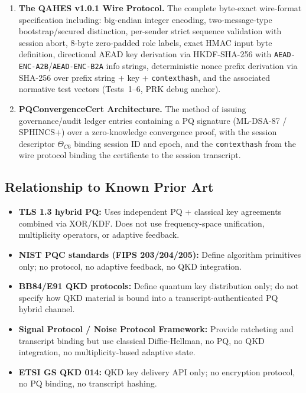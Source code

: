 \documentclass[12pt,letterpaper]{article}
\theoremstyle{plain}
\theoremstyle{definition}
\begin{document}
\begin{defensebox}
\begin{enumerate}[leftmargin=2em]
  \item \textbf{The QAHES v1.0.1 Wire Protocol.}
    The complete byte-exact wire-format specification including:
    big-endian integer encoding, two-message-type bootstrap/secured
    distinction, per-sender strict sequence validation with session abort,
    8-byte zero-padded role labels, exact HMAC input byte definition,
    directional AEAD key derivation via HKDF-SHA-256 with
    \texttt{AEAD-ENC-A2B}/\texttt{AEAD-ENC-B2A} info strings, deterministic
    nonce prefix derivation via SHA-256 over prefix string + key +
    \texttt{contexthash}, and the associated normative test vectors
    (Tests~1--6, PRK debug anchor).

  \item \textbf{PQConvergenceCert Architecture.}
    The method of issuing governance/audit ledger entries containing a
    PQ signature (ML-DSA-87 / SPHINCS+) over a zero-knowledge convergence
    proof, with the session descriptor $\Theta_{C6}$ binding session ID and
    epoch, and the \texttt{contexthash} from the wire protocol binding the
    certificate to the session transcript.
\end{enumerate}
\end{defensebox}

\subsection{Relationship to Known Prior Art}

\begin{itemize}[leftmargin=2em]
  \item \textbf{TLS 1.3 hybrid PQ:} Uses independent PQ + classical key
    agreements combined via XOR/KDF. Does not use frequency-space
    unification, multiplicity operators, or adaptive feedback.
  \item \textbf{NIST PQC standards (FIPS 203/204/205):} Define algorithm
    primitives only; no protocol, no adaptive feedback, no QKD integration.
  \item \textbf{BB84/E91 QKD protocols:} Define quantum key distribution
    only; do not specify how QKD material is bound into a
    transcript-authenticated PQ hybrid channel.
  \item \textbf{Signal Protocol / Noise Protocol Framework:} Provide
    ratcheting and transcript binding but use classical Diffie-Hellman,
    no PQ, no QKD integration, no multiplicity-based adaptive state.
  \item \textbf{ETSI GS QKD 014:} QKD key delivery API only; no encryption
    protocol, no PQ binding, no transcript hashing.
\end{itemize}
\end{document}
